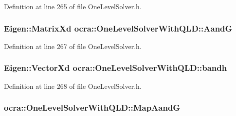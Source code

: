 Definition at line 265 of file One\+Level\+Solver.\+h.

\subsubsection[{\texorpdfstring{AandG}{AandG}}]{\setlength{\rightskip}{0pt plus 5cm}Eigen\+::\+Matrix\+Xd ocra\+::\+One\+Level\+Solver\+With\+Q\+L\+D\+::\+AandG\hspace{0.3cm}{\ttfamily [protected]}}\hypertarget{classocra_1_1OneLevelSolverWithQLD_aabe1df1e34e0e44246736da42822c51c}{}\label{classocra_1_1OneLevelSolverWithQLD_aabe1df1e34e0e44246736da42822c51c}


Definition at line 267 of file One\+Level\+Solver.\+h.

\subsubsection[{\texorpdfstring{bandh}{bandh}}]{\setlength{\rightskip}{0pt plus 5cm}Eigen\+::\+Vector\+Xd ocra\+::\+One\+Level\+Solver\+With\+Q\+L\+D\+::bandh\hspace{0.3cm}{\ttfamily [protected]}}\hypertarget{classocra_1_1OneLevelSolverWithQLD_a5f85407cde010aa3c41dbc80f3dd254e}{}\label{classocra_1_1OneLevelSolverWithQLD_a5f85407cde010aa3c41dbc80f3dd254e}


Definition at line 268 of file One\+Level\+Solver.\+h.

\subsubsection[{\texorpdfstring{Map\+AandG}{MapAandG}}]{ ocra\+::\+One\+Level\+Solver\+With\+Q\+L\+D\+::\+Map\+AandG\hspace{0.3cm}{\ttfamily [protected]}}\hypertarget{classocra_1_1OneLevelSolverWithQLD_a67c9e0cc8efc507c4e5f0cf216cf5073}{}\label{classocra_1_1OneLevelSolverWithQLD_a67c9e0cc8efc507c4e5f0cf216cf5073}


